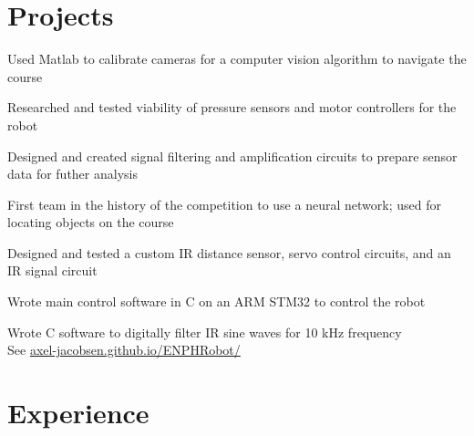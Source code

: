 \documentclass[]{deedy-resume-openfont}
\begin{document}

	\section{Projects}
	\begin{tightemize}
		\item Used Matlab to calibrate cameras for a computer vision algorithm to navigate the course
		\item Researched and tested viability of pressure sensors and motor controllers for the robot
		\item Designed and created signal filtering and amplification circuits to prepare sensor data for futher analysis
	\end{tightemize}
	\vspace{8pt}
	
	\begin{tightemize}
		\item First team in the history of the competition to use a neural network; used for locating objects on the course
		\item Designed and tested a custom IR distance sensor, servo control circuits, and an IR signal circuit
		\item Wrote main control software in C on an ARM STM32 to control the robot
		\item Wrote C software to digitally filter IR sine waves for 10 kHz frequency \\
		See \href{https://axel-jacobsen.github.io/ENPHRobot/}{axel-jacobsen.github.io/ENPHRobot/}
	\end{tightemize}
	\vspace{10pt}
	
	\section{Experience}
	
\end{document}
